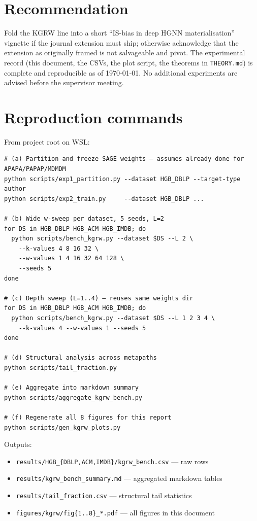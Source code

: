 \documentclass[11pt]{article}
\begin{document}
\section{Recommendation}

Fold the KGRW line into a short ``IS-bias in deep HGNN materialisation''
vignette if the journal extension must ship; otherwise acknowledge that
the extension as originally framed is not salvageable and pivot. The
experimental record (this document, the CSVs, the plot script, the
theorems in \texttt{THEORY.md}) is complete and reproducible as of
\today. No additional experiments are advised before the supervisor
meeting.

\appendix
\section{Reproduction commands}

From project root on WSL:

\begin{verbatim}
# (a) Partition and freeze SAGE weights — assumes already done for APAPA/PAPAP/MDMDM
python scripts/exp1_partition.py --dataset HGB_DBLP --target-type author
python scripts/exp2_train.py     --dataset HGB_DBLP ...

# (b) Wide w-sweep per dataset, 5 seeds, L=2
for DS in HGB_DBLP HGB_ACM HGB_IMDB; do
  python scripts/bench_kgrw.py --dataset $DS --L 2 \
    --k-values 4 8 16 32 \
    --w-values 1 4 16 32 64 128 \
    --seeds 5
done

# (c) Depth sweep (L=1..4) — reuses same weights dir
for DS in HGB_DBLP HGB_ACM HGB_IMDB; do
  python scripts/bench_kgrw.py --dataset $DS --L 1 2 3 4 \
    --k-values 4 --w-values 1 --seeds 5
done

# (d) Structural analysis across metapaths
python scripts/tail_fraction.py

# (e) Aggregate into markdown summary
python scripts/aggregate_kgrw_bench.py

# (f) Regenerate all 8 figures for this report
python scripts/gen_kgrw_plots.py
\end{verbatim}

Outputs:
\begin{itemize}
\item \texttt{results/HGB\_\{DBLP,ACM,IMDB\}/kgrw\_bench.csv} — raw rows
\item \texttt{results/kgrw\_bench\_summary.md} — aggregated markdown tables
\item \texttt{results/tail\_fraction.csv} — structural tail statistics
\item \texttt{figures/kgrw/fig\{1..8\}\_*.pdf} — all figures in this document
\end{itemize}
\end{document}
